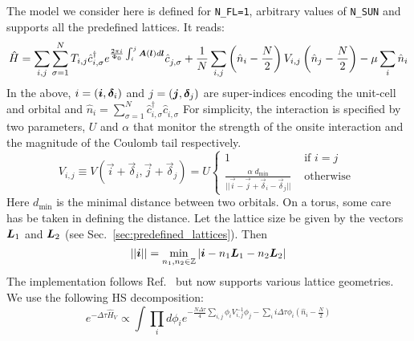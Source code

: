 
The model we consider  here is  defined  for \texttt{N\_FL=1},  arbitrary values of \texttt{N\_SUN}  and  supports all the predefined lattices.  It  reads: 
\begin{equation}
\hat{H}=  \sum_{i,j}  \sum_{\sigma =1}^{N}  T_{i, j}    \hat{c}^{\dagger}_{i, \sigma }   e^{\frac{2 \pi i}{\Phi_0} \int_{i}^{j}  
     \boldsymbol{A}(\boldsymbol{l})  d \boldsymbol{l}} \hat{c}^{}_{j,\sigma}   +
     \frac{1} { N } \sum_{i,j}  \left(  \hat{n}_{i} -  \frac{N}{2}  \right)  V_{i,j} \left(  \hat{n}_{j} -  \frac{N}{2}  \right)
      - \mu \sum_{i} \hat{n}_{i} 
\end{equation}
In the above,  $i = (\boldsymbol{i}, \boldsymbol{\delta}_i) $  and $j = (\boldsymbol{j}, \boldsymbol{\delta}_j) $  are super-indices encoding the unit-cell and orbital and 
$  \hat{n}_{i} = \sum_{\sigma =1}^{N} \hat{c}^{\dagger}_{i,\sigma } \hat{c}^{\phantom\dagger}_{i,\sigma} $ For simplicity, the interaction is specified by  two  parameters, $U$ and $\alpha$ that monitor the  strength of the onsite interaction and the magnitude of the Coulomb tail  respectively.  
\begin{equation}
	V_{i, j}     \equiv V(\vec{i}  + \vec{\delta}_i ,  \vec{j}  + \vec{\delta}_j  )  =   U \left\{
	\begin{array}{ll}  
	1          &   \text{ if }  i = j    \\
	\frac{\alpha   \;   d_\mathrm{min}}{  {  || \vec{i} - \vec{j} + \vec{\delta}_i - \vec{\delta}_j  ||}   } &     \text{ otherwise }
	\end{array}
\right.
\end{equation}
Here $d_\mathrm{min}$ is the minimal distance between two orbitals.      On a  torus, some care  has be taken in  defining the distance. Let the lattice size be given by the vectors $\boldsymbol{L}_1$  and  $\boldsymbol{L}_2$  (see Sec.~\ref{sec:predefined_lattices}).  Then 
\begin{equation}
	|| \boldsymbol{i} || = \min_{n_1,n_2 \in \mathbb{Z} }  | \boldsymbol{i} - n_1 \boldsymbol{L}_1 -  n_2 \boldsymbol{L}_2 | 
\end{equation}
The implementation follows Ref.~\cite{Hohenadler14}  but now supports various lattice geometries.  We use  the following  HS decomposition:
\begin{equation}
e^{-\Delta \tau \hat{H}_V }  \propto \int \prod_{i} d \phi_{i}   e^{ - \frac{N \Delta \tau} {4} \sum_{i,j} \phi_{i} V^{-1}_{i,j}  \phi_{j} - \sum_{i}  i \Delta \tau \phi_i \left( \hat{n}_{i} - \frac{N}{2} \right) } 
\end{equation}

